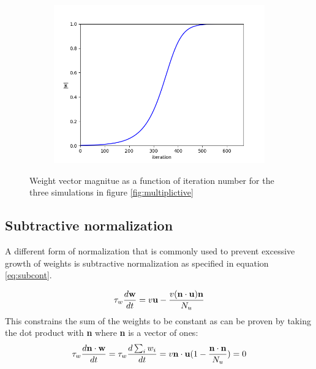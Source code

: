 \documentclass{article}
\begin{document}
\begin{figure}[h]
\begin{subfigure}[t]{0.30\linewidth}
		\subcaption{}
		\label{fig:sim2vec}	
	\end{subfigure}%
	\hspace{0.03\linewidth}
	\begin{subfigure}[t]{0.30\linewidth}
		\centering
		\includegraphics[width = 1.0\linewidth, trim={0 0 0 0}, clip=true]{figures/2d_sim3_vec.png}
		\subcaption{}
		\label{fig:sim3vec}	
	\end{subfigure}%
\caption{Weight vector magnitue as a function of iteration number for the three simulations in figure \ref{fig:multiplictive}}
\label{fig:multiplicativevec}
\end{figure}

\subsection{Subtractive normalization}

A different form of normalization that is commonly used to prevent excessive growth of weights is subtractive normalization as specified in equation \ref{eq:subcont}.

\begin{equation}\label{eq:subcont}
\tau_w \dfrac{d\bf{w}}{dt} = v {\bf{u}} - \dfrac{v(\bf{n}\cdot {\bf{u}}) {\bf{n}}}{N_u}
\end{equation}
This constrains the sum of the weights to be constant as can be proven by taking the dot product with \textbf{n} where \textbf{n} is a vector of ones:
\begin{equation}
\tau_w \dfrac{d\bf{n} \cdot \bf{w}}{dt} = \tau_w \dfrac{d\sum_i{w_i}}{dt} = v{\bf{n}} \cdot {\bf{u}}(1 - \dfrac{\bf{n}\cdot {\bf{n}}}{N_u}) = 0
\end{equation}
\end{document}
